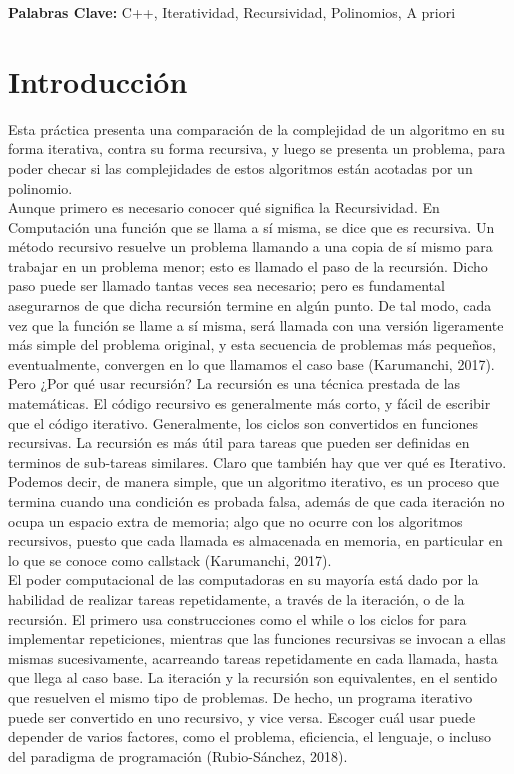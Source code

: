 \documentclass[12pt,twoside]{article}
\begin{document}
{\bf Palabras Clave:} C++, Iteratividad, Recursividad, Polinomios, A priori

\section{Introducci\'on}
Esta pr\'actica presenta una comparación de la complejidad de un algoritmo en su forma iterativa, contra su forma recursiva, y luego se presenta un problema, para poder checar si las complejidades de estos algoritmos están acotadas por un polinomio.
\\Aunque primero es necesario conocer qué significa la Recursividad. En Computación una función que se llama a sí misma, se dice que es recursiva. Un método recursivo resuelve un problema llamando a una copia de sí mismo para trabajar en un problema menor; esto es llamado el paso de la recursión. Dicho paso puede ser llamado tantas veces sea necesario; pero es fundamental asegurarnos de que dicha recursión termine en algún punto.
De tal modo, cada vez que la función se llame a sí misma, será llamada con una versión ligeramente más simple del problema original, y esta secuencia de problemas más pequeños, eventualmente, convergen en lo que llamamos el caso base (Karumanchi, 2017).
\newpage
Pero ¿Por qué usar recursión? La recursión es una técnica prestada de las matemáticas. El código recursivo es generalmente más corto, y fácil de escribir que el código iterativo. Generalmente, los ciclos son convertidos en funciones recursivas.
La recursión es más útil para tareas que pueden ser definidas en terminos de sub-tareas similares.
Claro que también hay que ver qué es Iterativo.
Podemos decir, de manera simple, que un algoritmo iterativo, es un proceso que termina cuando una condición es probada falsa, además de que cada iteración no ocupa un espacio extra de memoria; algo que no ocurre con los algoritmos recursivos, puesto que cada llamada es almacenada en memoria, en particular en lo que se conoce como callstack (Karumanchi, 2017).
\\ El poder computacional de las computadoras en su mayoría está dado por la habilidad de realizar tareas repetidamente, a través de la iteración, o de la recursión. El primero usa construcciones como el while o los ciclos for para implementar repeticiones, mientras que las funciones recursivas se invocan a ellas mismas sucesivamente, acarreando tareas repetidamente en cada llamada, hasta que llega al caso base.
La iteración y la recursión son equivalentes, en el sentido que resuelven el mismo tipo de problemas. De hecho, un programa iterativo puede ser convertido en uno recursivo, y vice versa. Escoger cuál usar puede depender de varios factores, como el problema, eficiencia, el lenguaje, o incluso del paradigma de programación (Rubio-Sánchez, 2018).
\end{document}

